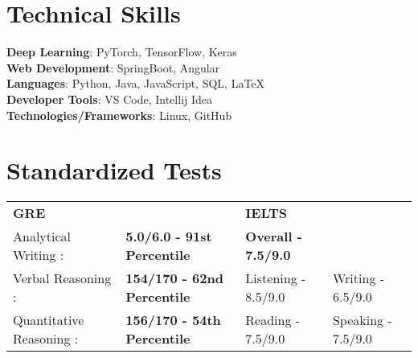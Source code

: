 \documentclass[letterpaper,11pt]{article}
\makeatletter
\newcommand{\resumeItem}[1]{
  \item\small{
    {#1 \vspace{-2pt}}
  }
}
\newcommand{\resumeSubheading}[4]{
  \vspace{-2pt}\item
    \begin{tabular*}{1.0\textwidth}[t]{l@{\extracolsep{\fill}}r}
      \textbf{#1} & \textbf{\small #2} \\
      \textit{\small#3} & \textit{\small #4} \\
    \end{tabular*}\vspace{-7pt}
}
\newcommand{\resumeSubHeadingListStart}{\begin{itemize}[leftmargin=0.0in, label={}]}
\newcommand{\resumeItemListStart}{\begin{itemize}}
\newcommand{\resumeItemListEnd}{\end{itemize}\vspace{-5pt}}
\makeatother
\begin{document}
\section{Technical Skills}
\begin{multicols}{2}
	\begin{itemize}[leftmargin=0.15in, label={}]
		\small{\item{
			            \textbf{Deep Learning}{: PyTorch, TensorFlow, Keras} \\
			            \textbf{Web Development}{: SpringBoot, Angular} \\
			            \textbf{Languages}{: Python, Java, JavaScript, SQL, \LaTeX} \\
			            \textbf{Developer Tools}{: VS Code, Intellij Idea} \\
			            \textbf{Technologies/Frameworks}{: Linux, GitHub} \\
			      }}
	\end{itemize}
\end{multicols}

\section{Standardized Tests}
\hspace{7pt}
\begin{tabularx}{\textwidth}{p{}p{}p{}p{}}
	\textbf{GRE}             &                                    & \textbf{IELTS}             &                    \\
	Analytical Writing :     & \textbf{5.0/6.0 - 91st Percentile} & \textbf{Overall - 7.5/9.0} &                    \\
	Verbal Reasoning :       & \textbf{154/170 - 62nd Percentile} & Listening - 8.5/9.0        & Writing - 6.5/9.0  \\
	Quantitative Reasoning : & \textbf{156/170 - 54th Percentile} & Reading - 7.5/9.0          & Speaking - 7.5/9.0 \\
\end{tabularx}

\end{document}
